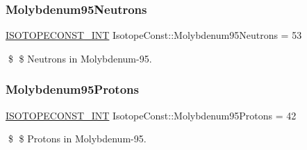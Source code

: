 \subsubsection{\texorpdfstring{Molybdenum95\+Neutrons}{Molybdenum95Neutrons}}
{\footnotesize\ttfamily \mbox{\hyperlink{group___isotope_const-_macros_ga5f18360b3e99483a35c32d789e62621c}{I\+S\+O\+T\+O\+P\+E\+C\+O\+N\+S\+T\+\_\+\+I\+NT}} Isotope\+Const\+::\+Molybdenum95\+Neutrons = 53}

\$ \$ Neutrons in Molybdenum-\/95. \mbox{\label{group___isotope_const-_molybdenum-_mo95_gac4b55c721c081fa4160c7ed6c44eab35}} 
\subsubsection{\texorpdfstring{Molybdenum95\+Protons}{Molybdenum95Protons}}
{\footnotesize\ttfamily \mbox{\hyperlink{group___isotope_const-_macros_ga5f18360b3e99483a35c32d789e62621c}{I\+S\+O\+T\+O\+P\+E\+C\+O\+N\+S\+T\+\_\+\+I\+NT}} Isotope\+Const\+::\+Molybdenum95\+Protons = 42}

\$ \$ Protons in Molybdenum-\/95. 